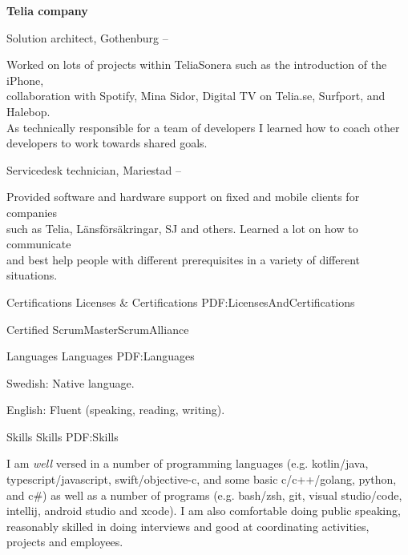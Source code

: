 \documentclass[letterpaper,MMMyyyy,nonstopmode]{resume}
\begin{document}
\begin{Body}
\BigGap
\Entry
\textbf{Telia company}

\Gap
\BulletItem
Solution architect, Gothenburg
\hfill
{} --

\begin{Detail}
\SubBulletItem
Worked on lots of projects within TeliaSonera such as the introduction of the iPhone,\\collaboration with Spotify, Mina Sidor, Digital TV on Telia.se, Surfport, and Halebop.\\As technically responsible for a team of developers I learned how to coach other\\developers to work towards shared goals.
\end{Detail}

\Gap
\BulletItem
Servicedesk technician, Mariestad
\hfill
{} --

\begin{Detail}
\SubBulletItem
Provided software and hardware support on fixed and mobile clients for companies\\ such as Telia, Länsförsäkringar, SJ and others. Learned a lot on how to communicate\\ and best help people with different prerequisites in a variety of different situations.
\end{Detail}



\Section
{Certifications}
{Licenses \& Certifications}
{PDF:LicensesAndCertifications}

\BulletItem
Certified ScrumMaster\newline ScrumAlliance
\hfill
{}


\Section
{Languages}
{Languages}
{PDF:Languages}

\BulletItem
Swedish: Native language.

\Gap
\BulletItem
English: Fluent (speaking, reading, writing).


\Section
{Skills}
{Skills}
{PDF:Skills}

\Entry
I am \emph{well} versed in a number of programming languages (e.g. kotlin/java, typescript/javascript, swift/objective-c, and some basic c/c++/golang, python, and c\#) as well as a number of programs (e.g. bash/zsh, git, visual studio/code, intellij, android studio and xcode). I am also comfortable doing public speaking, reasonably skilled in doing interviews and good at coordinating activities, projects and employees.


\end{Body}
\end{document}
